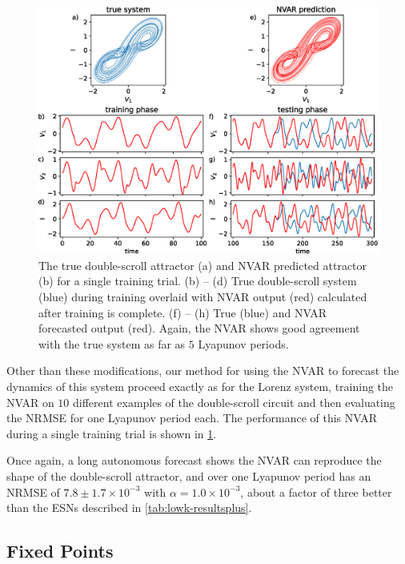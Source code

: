 \begin{figure}
  \includegraphics[width=\textwidth]{figures/nvar-predict-dscroll}
  \caption{The true double-scroll attractor (a) and NVAR predicted
    attractor (b) for a single training trial. (b) -- (d) True
    double-scroll system (blue) during training overlaid with NVAR
    output (red) calculated after training is complete. (f) -- (h)
    True (blue) and NVAR forecasted output (red). Again, the NVAR
    shows good agreement with the true system as far as $5$ Lyapunov
    periods.}
  \label{fig:nvar-predict-dscroll}
\end{figure}

Other than these modifications, our method for using the NVAR to
forecast the dynamics of this system proceed exactly as for the Lorenz
system, training the NVAR on $10$ different examples of the
double-scroll circuit and then evaluating the NRMSE for one Lyapunov
period each. The performance of this NVAR during a single training
trial is shown in \cref{fig:nvar-predict-dscroll}.

Once again, a long autonomous forecast shows the NVAR can reproduce
the shape of the double-scroll attractor, and over one Lyapunov period
has an NRMSE of $7.8\pm1.7\times10^{-3}$ with $\alpha =
1.0\times10^{-3}$, about a factor of three better than the ESNs
described in \cref{tab:lowk-resultsplus}.

\subsection{Fixed Points}

